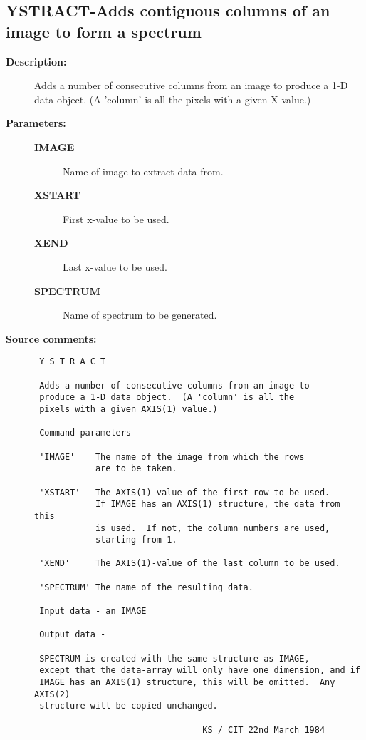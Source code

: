 \subsection{YSTRACT-\label{YSTRACT}Adds contiguous columns of an image to form a spectrum}
\begin{description}

\item [{\bf Description:}]
 Adds a number of consecutive columns from an image to produce a 1-D
 data object.  (A 'column' is all the pixels with a given X-value.)

\item [{\bf Parameters:}]
\begin{description}
\item [{\bf IMAGE}]
 Name of image to extract data from.
\item [{\bf XSTART}]
 First x-value to be used.
\item [{\bf XEND}]
 Last x-value to be used.
\item [{\bf SPECTRUM}]
 Name of spectrum to be generated.
\end{description}

\item [{\bf Source comments:}]
\begin{verbatim}
 Y S T R A C T

 Adds a number of consecutive columns from an image to
 produce a 1-D data object.  (A 'column' is all the
 pixels with a given AXIS(1) value.)

 Command parameters -

 'IMAGE'    The name of the image from which the rows
            are to be taken.

 'XSTART'   The AXIS(1)-value of the first row to be used.
            If IMAGE has an AXIS(1) structure, the data from this
            is used.  If not, the column numbers are used,
            starting from 1.

 'XEND'     The AXIS(1)-value of the last column to be used.

 'SPECTRUM' The name of the resulting data.

 Input data - an IMAGE

 Output data -

 SPECTRUM is created with the same structure as IMAGE,
 except that the data-array will only have one dimension, and if
 IMAGE has an AXIS(1) structure, this will be omitted.  Any AXIS(2)
 structure will be copied unchanged.

                                 KS / CIT 22nd March 1984
\end{verbatim}
\end{description}
